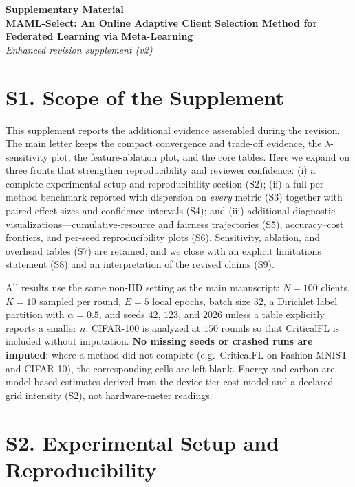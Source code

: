 \documentclass[10pt]{article}
\begin{document}
\begin{center}
{\Large \textbf{Supplementary Material}}\\[0.4em]
{\large \textbf{MAML-Select: An Online Adaptive Client Selection Method for Federated Learning via Meta-Learning}}\\[0.3em]
{\normalsize \textit{Enhanced revision supplement (v2)}}
\end{center}

\section*{S1. Scope of the Supplement}

This supplement reports the additional evidence assembled during the revision. The main letter keeps the compact convergence and trade-off evidence, the $\lambda$-sensitivity plot, the feature-ablation plot, and the core tables. Here we expand on three fronts that strengthen reproducibility and reviewer confidence: (i) a complete experimental-setup and reproducibility section (S2); (ii) a full per-method benchmark reported with dispersion on \emph{every} metric (S3) together with paired effect sizes and confidence intervals (S4); and (iii) additional diagnostic visualizations---cumulative-resource and fairness trajectories (S5), accuracy--cost frontiers, and per-seed reproducibility plots (S6). Sensitivity, ablation, and overhead tables (S7) are retained, and we close with an explicit limitations statement (S8) and an interpretation of the revised claims (S9).

All results use the same non-IID setting as the main manuscript: $N=100$ clients, $K=10$ sampled per round, $E=5$ local epochs, batch size $32$, a Dirichlet label partition with $\alpha=0.5$, and seeds $42$, $123$, and $2026$ unless a table explicitly reports a smaller $n$. CIFAR-100 is analyzed at $150$ rounds so that CriticalFL is included without imputation. \textbf{No missing seeds or crashed runs are imputed}: where a method did not complete (e.g.\ CriticalFL on Fashion-MNIST and CIFAR-10), the corresponding cells are left blank. Energy and carbon are model-based estimates derived from the device-tier cost model and a declared grid intensity (S2), not hardware-meter readings.

\section*{S2. Experimental Setup and Reproducibility}
\end{document}
